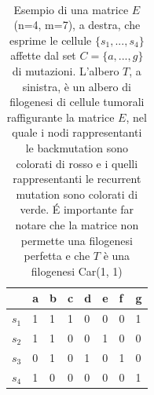 \documentclass{report}
\begin{document}
\begin{table}[H]
    ~\hfill~
    \begin{minipage}{0.5\textwidth}
    \centering
      \begin{tabular}{|l|l|l|l|l|l|l|l|}
        \hline
         & a & b & c & d & e & f & g\\
        \hline
        $s_{1}$ & 1 & 1 & 1 & 0 & 0 & 0 & 1\\
        \hline
        $s_{2}$ & 1 & 1 & 0 & 0 & 1 & 0 & 0\\
        \hline
        $s_{3}$ & 0 & 1 & 0 & 1 & 0 & 1 & 0\\
        \hline
        $s_{4}$ & 1 & 0 & 0 & 0 & 0 & 0 & 1\\
        \hline
      \end{tabular}
    \end{minipage}
    \caption{Esempio di una matrice $E$ (n=4, m=7), a destra, che esprime le cellule $\{ s_{1},...,s_{4}\}$ affette dal set $C = \{ a,...,g\}$ di mutazioni. L'albero $T$, a sinistra, è un albero di filogenesi di cellule tumorali raffigurante la matrice $E$,
    nel quale i nodi rappresentanti le backmutation sono colorati di rosso e i quelli rappresentanti le recurrent mutation sono colorati di verde. \'E importante far notare che la matrice non permette una filogenesi perfetta e che $T$ è una filogenesi Car(1, 1)}
    \label{fig:fig1}
  \end{table}
\end{document}

